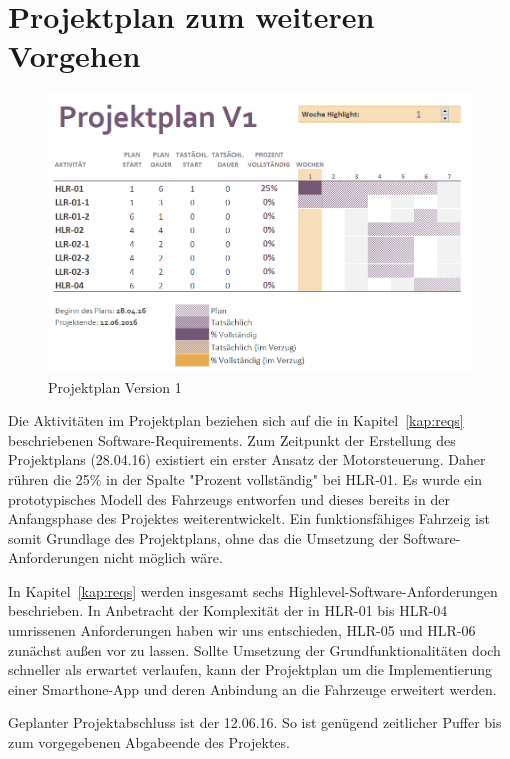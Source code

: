\documentclass[a4paper,12pt]{article}                                         %
\numberwithin{table}{section}                               %
\numberwithin{figure}{section}                              %
\begin{document}
	\newpage
	\section{Projektplan zum weiteren Vorgehen}
	
		\begin{figure}[h]
			\begin{center}
				\includegraphics[scale=0.8]{../Bilder/PlanV1.png}
			\end{center}
			\caption{Projektplan Version 1}
		\end{figure}
		
	Die Aktivitäten im Projektplan beziehen sich auf die in Kapitel~\ref{kap:reqs} beschriebenen Software-Requirements. Zum Zeitpunkt der Erstellung des Projektplans (28.04.16) existiert ein erster Ansatz der Motorsteuerung. Daher rühren die 25\% in der Spalte "Prozent vollständig" bei HLR-01. Es wurde ein prototypisches Modell des Fahrzeugs entworfen und dieses bereits in der Anfangsphase des Projektes weiterentwickelt. Ein funktionsfähiges Fahrzeig ist somit Grundlage des Projektplans, ohne das die Umsetzung der Software-Anforderungen nicht möglich wäre. 
	
	\bigskip
	In Kapitel~\ref{kap:reqs} werden insgesamt sechs Highlevel-Software-Anforderungen beschrieben. In Anbetracht der Komplexität der in HLR-01 bis HLR-04 umrissenen Anforderungen haben wir uns entschieden, HLR-05 und HLR-06 zunächst außen vor zu lassen. Sollte Umsetzung der Grundfunktionalitäten doch schneller als erwartet verlaufen, kann der Projektplan um die Implementierung einer Smarthone-App und deren Anbindung an die Fahrzeuge erweitert werden.
	
	\bigskip
	Geplanter Projektabschluss ist der 12.06.16. So ist genügend zeitlicher Puffer bis zum vorgegebenen Abgabeende des Projektes. 
	
\end{document}
